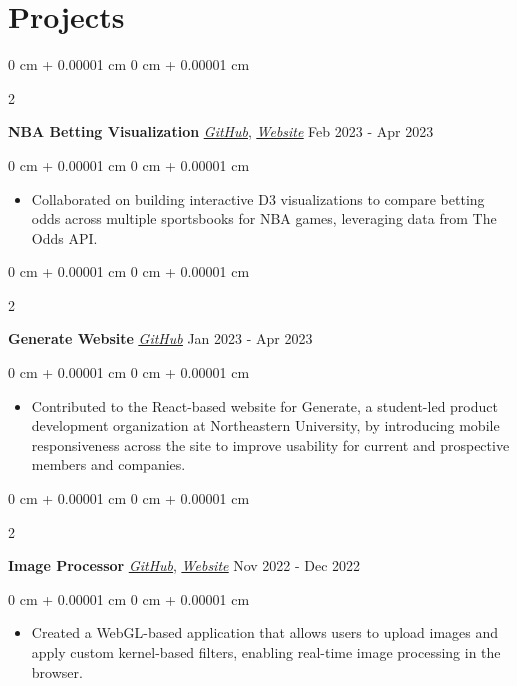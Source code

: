 \documentclass[10pt, letterpaper]{article}
\newenvironment{highlights}{
    \begin{itemize}[
        topsep=0.10 cm,
        parsep=0.10 cm,
        partopsep=0pt,
        itemsep=0pt,
        leftmargin=0 cm + 10pt
    ]
}{
    \end{itemize}
} %
\newenvironment{onecolentry}{
    \begin{adjustwidth}{
        0 cm + 0.00001 cm
    }{
        0 cm + 0.00001 cm
    }
}{
    \end{adjustwidth}
} %
\newenvironment{twocolentry}[2][]{
    \onecolentry
    \def\secondColumn{#2}
    \setcolumnwidth{\fill, 4.5 cm}
    \begin{paracol}{2}
}{
    \switchcolumn \raggedleft \secondColumn
    \end{paracol}
    \endonecolentry
} %
\begin{document}
    \section{Projects}
        \begin{twocolentry}{
            Feb 2023 - Apr 2023
        }
        \textbf{NBA Betting Visualization} \href{https://github.com/GenerateNU/website}{\textit{\underline{GitHub}}}, \href{https://ds4200-s23-class.github.io/project-zach-george-filip-travis/}{\textit{\underline{Website}}}\end{twocolentry}
        \vspace{0.10 cm}
        \begin{onecolentry}
            \begin{highlights}
                \item Collaborated on building interactive D3 visualizations to compare betting odds across multiple sportsbooks for NBA games, leveraging data from The Odds API.
            \end{highlights}
        \end{onecolentry}
        \vspace{0.2 cm}
        \begin{twocolentry}{
            Jan 2023 - Apr 2023
        }
        \textbf{Generate Website} \href{https://github.com/GenerateNU/website}{\textit{\underline{GitHub}}}\end{twocolentry}
        \vspace{0.10 cm}
        \begin{onecolentry}
            \begin{highlights}
                \item Contributed to the React-based website for Generate, a student-led product development organization at Northeastern University, by introducing mobile responsiveness across the site to improve usability for current and prospective members and companies.
            \end{highlights}
        \end{onecolentry}
        \vspace{0.2 cm}
        \begin{twocolentry}{
            Nov 2022 - Dec 2022
        }
        \textbf{Image Processor} \href{https://github.com/zachnorman02/webgl-image-processor}{\textit{\underline{GitHub}}}, \href{https://zachnorman02.github.io/webgl-image-processor/}{\textit{\underline{Website}}}\end{twocolentry}
        \vspace{0.10 cm}
        \begin{onecolentry}
            \begin{highlights}
                \item  Created a WebGL-based application that allows users to upload images and apply custom kernel-based filters, enabling real-time image processing in the browser.
            \end{highlights}
        \end{onecolentry}
        \vspace{0.2 cm}
\end{document}
